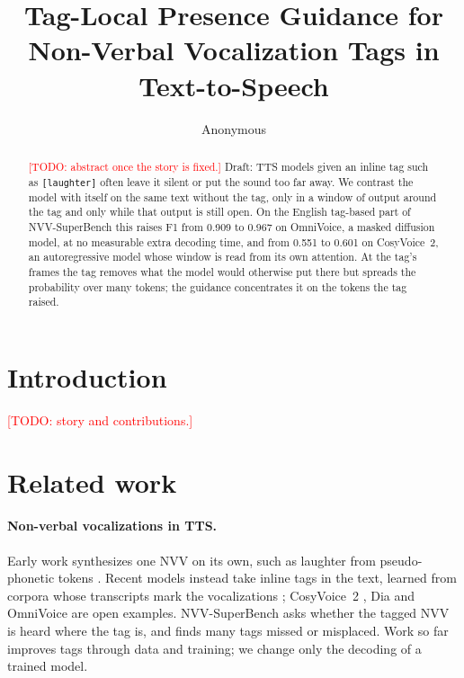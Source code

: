 \documentclass[11pt]{article}
\title{Tag-Local Presence Guidance for Non-Verbal Vocalization Tags in Text-to-Speech}
\author{Anonymous}
\newcommand{\tg}[1]{\texttt{[#1]}}
\newcommand{\todo}[1]{\textcolor{red}{[TODO: #1]}}
\begin{document}
\maketitle

\begin{abstract}
\todo{abstract once the story is fixed.} Draft: TTS models given an inline tag such as \tg{laughter} often leave it silent or put the sound too far away. We contrast the model with itself on the same text without the tag, only in a window of output around the tag and only while that output is still open. On the English tag-based part of NVV-SuperBench this raises F1 from 0.909 to 0.967 on OmniVoice, a masked diffusion model, at no measurable extra decoding time, and from 0.551 to 0.601 on CosyVoice~2, an autoregressive model whose window is read from its own attention. At the tag's frames the tag removes what the model would otherwise put there but spreads the probability over many tokens; the guidance concentrates it on the tokens the tag raised.
\end{abstract}

\section{Introduction}
\todo{story and contributions.}

\section{Related work}
\label{sec:related}

\paragraph{Non-verbal vocalizations in TTS.} Early work synthesizes one NVV on its own, such as laughter from pseudo-phonetic tokens \citep{xin2023laughter}. Recent models instead take inline tags in the text, learned from corpora whose transcripts mark the vocalizations \citep{borisov2025nonverbaltts,liao2025nvspeech}; CosyVoice~2 \citep{du2024cosyvoice2}, Dia \citep{nari2025dia} and OmniVoice \citep{zhu2026omnivoice} are open examples. NVV-SuperBench \citep{xue2026nvvsuperbench} asks whether the tagged NVV is heard where the tag is, and finds many tags missed or misplaced. Work so far improves tags through data and training; we change only the decoding of a trained model.
\end{document}
